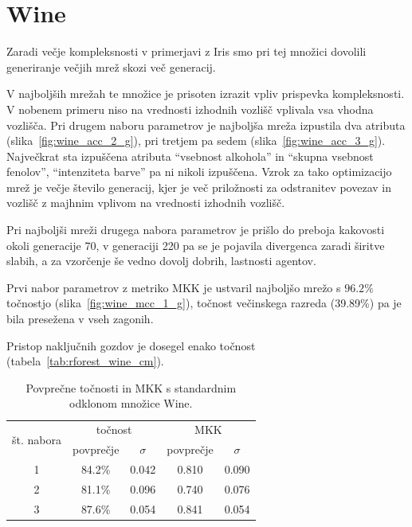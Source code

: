 \documentclass[a4paper,12pt,openright]{book}
\begin{document}
    \section{Wine}\label{sec:rezultati-wine}
    Zaradi večje kompleksnosti v primerjavi z Iris smo pri tej množici dovolili generiranje večjih mrež skozi več generacij.

    V najboljših mrežah te množice je prisoten izrazit vpliv prispevka kompleksnosti.
    V nobenem primeru niso na vrednosti izhodnih vozlišč vplivala vsa vhodna vozlišča.
    Pri drugem naboru parametrov je najboljša mreža izpustila dva atributa (slika~\ref{fig:wine_acc_2_g}), pri tretjem pa sedem (slika~\ref{fig:wine_acc_3_g}).
    Največkrat sta izpuščena atributa \enquote{vsebnost alkohola} in \enquote{skupna vsebnost fenolov},
    \enquote{intenziteta barve} pa ni nikoli izpuščena.
    Vzrok za tako optimizacijo mrež je večje število generacij, kjer je več priložnosti za odstranitev povezav in vozlišč z majhnim
    vplivom na vrednosti izhodnih vozlišč.

    Pri najboljši mreži drugega nabora parametrov je prišlo do preboja kakovosti okoli generacije 70, v generaciji 220
    pa se je pojavila divergenca zaradi širitve slabih, a za vzorčenje še vedno dovolj dobrih, lastnosti agentov.

    Prvi nabor parametrov z metriko MKK je ustvaril najboljšo mrežo s $96.2\%$ točnostjo (slika~\ref{fig:wine_mcc_1_g}),
    točnost večinskega razreda (39.89\%) pa je bila presežena v vseh zagonih.

    Pristop naključnih gozdov je dosegel enako točnost (tabela~\ref{tab:rforest_wine_cm}).

    \begin{table}[H]
        \begin{center}
            \begin{tabular}{|| c | c c || c c ||}
                \hline
                \multirow{2}{*}{št. nabora} & \multicolumn{2}{c||}{točnost} & \multicolumn{2}{c||}{MKK} \\ \cline{2-5}
                & povprečje & $\sigma$ & povprečje & $\sigma$ \\
                \hline
                1 & 84.2\%    & 0.042    & 0.810     & 0.090    \\
                2 & 81.1\%    & 0.096    & 0.740     & 0.076    \\
                3 & 87.6\%    & 0.054    & 0.841     & 0.054    \\
                \hline
            \end{tabular}
        \end{center}
        \caption{Povprečne točnosti in MKK s standardnim odklonom množice Wine.}
        \label{tab:random-forest-wine-test}
    \end{table}
\end{document}
